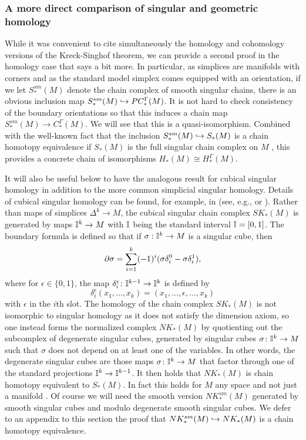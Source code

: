 \subsubsection{A more direct comparison of singular and geometric homology}

While it was convenient to cite simultaneously the homology and cohomology versions of the Kreck-Singhof theorem, we can provide a second proof in the homology case that says a bit more. In particular, as simplices are manifolds with corners and as the standard model simplex comes equipped with an orientation, if we let $S^{sm}_*(M)$ denote the chain complex of smooth singular chains, there is an obvious inclusion map $S^{sm}_*(M) \hookrightarrow PC_*^\Gamma(M)$. It is not hard to check consistency of the boundary orientations so that this induces a chain map $S^{sm}_*(M) \to C_*^\Gamma(M)$. We will see that this is a quasi-isomorphism. Combined with the well-known fact that the inclusion $S^{sm}_*(M) \hookrightarrow S_*(M)$ is a chain homotopy equivalence if $S_*(M)$ is the full singular chain complex on $M$ \cite[Theorem 18.7]{Lee13}, this provides a concrete chain of isomorphisms $H_*(M) \cong H_*^\Gamma(M)$.

It will also be useful below to have the analogous result for cubical singular homology in addition to the more common simplicial singular homology. Details of cubical singular homology can be found, for example, in (see, e.g., \cite{Mas91} or \cite[Section 8.3]{HW60}). Rather than maps of simplices $\Delta^k \to M$, the cubical singular chain complex $SK_*(M)$ is generated by maps $\mathbb{I}^k \to M$ with $\mathbb{I}$ being the standard interval $\mathbb{I} = [0,1]$. The boundary formula is defined so that if $\sigma: \mathbb{I}^k \to M$ is a singular cube, then
\begin{equation}\label{E: cube bd}
	\partial \sigma = \sum_{i = 1}^k (-1)^i(\sigma \delta_i^0-\sigma \delta^1_i),
\end{equation}
where for $\epsilon\in\{0,1\}$, the map $\delta_i^\epsilon \colon \mathbb{I}^{k-1} \to \mathbb{I}^k$ is defined by
$$\delta_i^\epsilon(x_1,\ldots,x_k) = (x_1,\ldots,\epsilon,\ldots, x_k)$$
with $\epsilon$ in the $i$th slot. The homology of the chain complex $SK_*(M)$ is not isomorphic to singular homology as it does not satisfy the dimension axiom, so one instead forms the normalized complex $NK_*(M)$ by quotienting out the subcomplex of degenerate singular cubes, generated by singular cubes $\sigma \colon \mathbb{I}^k \to M$ such that $\sigma$ does not depend on at least one of the variables. In other words, the degenerate singular cubes are those maps $\sigma \colon \mathbb{I}^k \to M$ that factor through one of the standard projections $\mathbb{I}^k \to \mathbb{I}^{k-1}$. It then holds that $NK_*(M)$ is chain homotopy equivalent to $S_*(M)$. In fact this holds for $M$ any space and not just a manifold \cite[Theorem 8.4.7]{HW60}. Of course we will need the smooth version $NK^{sm}_*(M)$ generated by smooth singular cubes and modulo degenerate smooth singular cubes. We defer to an appendix to this section the proof that $NK^{sm}_*(M) \hookrightarrow NK_*(M)$ is a chain homotopy equivalence.

